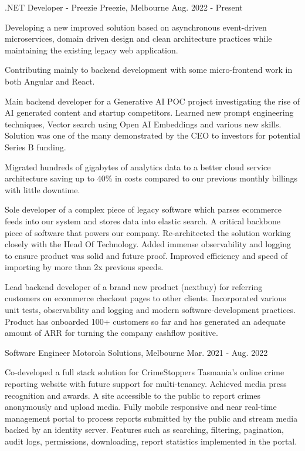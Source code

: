 

\vspace{-0.5\baselineskip}
\begin{cventries}
  \cventry
    {}
    {.NET Developer - Preezie}
    {Preezie, Melbourne}
    {Aug. 2022 - Present}
    {
      \begin{cvitems}
        \item {Developing a new improved solution based on asynchronous event-driven microservices, domain driven design and clean architecture practices while maintaining the existing legacy web application.}
        \item {Contributing mainly to backend development with some micro-frontend work in both Angular and React.}
        \item {Main backend developer for a Generative AI POC project investigating the rise of AI generated content and startup competitors. Learned new prompt engineering techniques, Vector search using Open AI Embeddings and various new skills. Solution was one of the many demonstrated by the CEO to investors for potential Series B funding.}
		\item {Migrated hundreds of gigabytes of analytics data to a better cloud service architecture saving up to 40\% in costs compared to our previous monthly billings with little downtime.}
        \item {Sole developer of a complex piece of legacy software which parses ecommerce feeds into our system and stores data into elastic search. A critical backbone piece of software that powers our company. Re-architected the solution working closely with the Head Of Technology. Added immense observability and logging to ensure product was solid and future proof. Improved efficiency and speed of importing by more than 2x previous speeds.}
        \item {Lead backend developer of a brand new product (nextbuy) for referring customers on ecommerce checkout pages to other clients. Incorporated various unit tests, observability and logging and modern software-development practices. Product has onboarded 100+ customers so far and has generated an adequate amount of ARR for turning the company cashflow positive.}
	  \end{cvitems}
    }
  \cventry
    {}
    {Software Engineer}
    {Motorola Solutions, Melbourne}
    {Mar. 2021 - Aug. 2022}
    {
      \begin{cvitems}
        \item {Co-developed a full stack solution for CrimeStoppers Tasmania's online crime reporting website with future support for multi-tenancy. Achieved media press recognition and awards. A site accessible to the public to report crimes anonymously and upload media. Fully mobile responsive and near real-time management portal to process reports submitted by the public and stream media backed by an identity server. Features such as searching, filtering, pagination, audit logs, permissions, downloading, report statistics implemented in the portal.}

\end{cvitems}}
\end{cventries}
